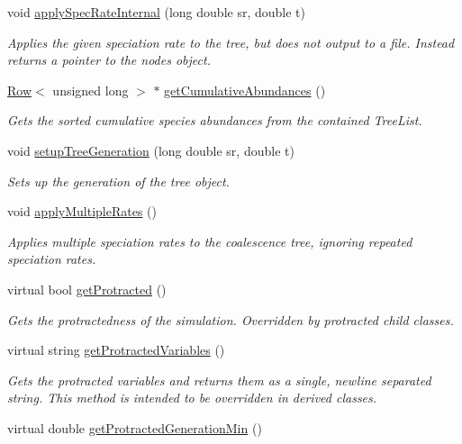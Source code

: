 \begin{DoxyCompactItemize}
void \hyperlink{class_tree_ac89abe0404d05d0363258b72cb80700b}{apply\+Spec\+Rate\+Internal} (long double sr, double t)
\begin{DoxyCompactList}\small\item\em Applies the given speciation rate to the tree, but does not output to a file. Instead returns a pointer to the nodes object. \end{DoxyCompactList}\item 
\hyperlink{class_row}{Row}$<$ unsigned long $>$ $\ast$ \hyperlink{class_tree_a49a94b2218f7ae127a53af4a58d02b06}{get\+Cumulative\+Abundances} ()
\begin{DoxyCompactList}\small\item\em Gets the sorted cumulative species abundances from the contained Tree\+List. \end{DoxyCompactList}\item 
void \hyperlink{class_tree_a9997b98824a786d9843a3df40de1226a}{setup\+Tree\+Generation} (long double sr, double t)
\begin{DoxyCompactList}\small\item\em Sets up the generation of the tree object. \end{DoxyCompactList}\item 
void \hyperlink{class_tree_acfc7efdec999f6dbf2ac089514d22091}{apply\+Multiple\+Rates} ()
\begin{DoxyCompactList}\small\item\em Applies multiple speciation rates to the coalescence tree, ignoring repeated speciation rates. \end{DoxyCompactList}\item 
virtual bool \hyperlink{class_tree_aa23a57f7863d58384f61d464d998ab3c}{get\+Protracted} ()
\begin{DoxyCompactList}\small\item\em Gets the protractedness of the simulation. Overridden by protracted child classes. \end{DoxyCompactList}\item 
virtual string \hyperlink{class_tree_a34c0808026bf00546c8f9786376be730}{get\+Protracted\+Variables} ()
\begin{DoxyCompactList}\small\item\em Gets the protracted variables and returns them as a single, newline separated string. This method is intended to be overridden in derived classes. \end{DoxyCompactList}\item 
virtual double \hyperlink{class_tree_a6ffc42e941f352cd74f01f6f7011f00b}{get\+Protracted\+Generation\+Min} ()

\end{DoxyCompactItemize}
